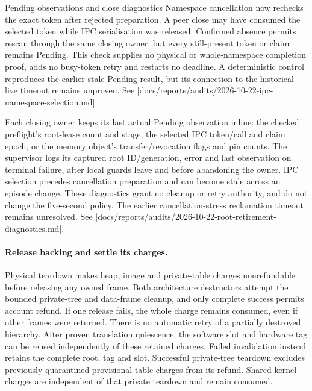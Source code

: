 \begin{implementationdetail}{Pending observations and close diagnostics}
Namespace cancellation now rechecks the exact token after rejected preparation.
A peer close may have consumed the selected token while IPC serialisation was
released. Confirmed absence permits rescan through the same closing owner, but
every still-present token or claim remains Pending. This check supplies no
physical or whole-namespace completion proof, adds no busy-token retry and
restarts no deadline. A deterministic control reproduces the earlier stale
Pending result, but its connection to the historical live timeout remains unproven.
See \repofile|docs/reports/audits/2026-10-22-ipc-namespace-selection.md|.

Each closing owner keeps its last actual Pending observation inline: the
checked preflight's root-lease count and stage, the selected IPC token/call and
claim epoch, or the memory object's transfer/revocation flags and pin counts.
The supervisor logs its captured root ID/generation, error and last observation
on terminal failure, after local guards leave and before abandoning the owner.
IPC selection precedes cancellation preparation and can become stale across an
episode change. These diagnostics grant no cleanup or retry authority, and do
not change the five-second policy. The earlier cancellation-stress reclamation
timeout remains unresolved. See
\repofile|docs/reports/audits/2026-10-22-root-retirement-diagnostics.md|.
\end{implementationdetail}

\paragraph*{Release backing and settle its charges.}

Physical teardown makes heap, image and private-table charges nonrefundable before releasing
any owned frame. Both architecture destructors attempt the bounded private-tree
and data-frame cleanup, and only complete success permits account refund. If one
release fails, the whole charge remains consumed, even if other frames were
returned. There is no automatic retry of a partially destroyed hierarchy.
After proven translation quiescence, the software slot and hardware tag can be
reused independently of these retained charges. Failed invalidation instead
retains the complete root, tag and slot. Successful private-tree teardown excludes
previously quarantined provisional table charges from its refund. Shared kernel
charges are independent of that private teardown and remain consumed.

